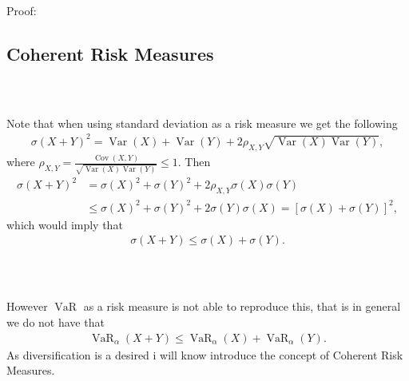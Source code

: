 \documentclass{beamer}
\numberwithin{equation}{section}
\DeclareMathOperator*{\var}{Var}
\DeclareMathOperator*{\cov}{Cov}
\DeclareMathOperator{\VaR}{VaR}
\begin{document}
\begin{frame}\frametitle{{\normalsize \secname} \\ {\large \subsecname}}
    Proof:
    \vspace{6cm}
\end{frame}

\subsection{Coherent Risk Measures}

\begin{frame}\frametitle{{\normalsize \secname} \\ {\large \subsecname}}
    Note that when using standard deviation as a risk measure we get the following
    \begin{align}
        \sigma(X + Y)^2 = \var(X) + \var(Y) + 2\rho_{X,Y}\sqrt{\var(X)\var(Y)},
    \end{align}
    where $\rho_{X,Y} = \frac{\cov(X,Y)}{\sqrt{\var(X)\var(Y)}} \leq 1$.
    Then
    \begin{align}
        \sigma(X + Y)^2 &= \sigma(X)^2 + \sigma(Y)^2 + 2\rho_{X,Y}\sigma(X)\sigma(Y)\\
        &\leq \sigma(X)^2 + \sigma(Y)^2 + 2\sigma(Y)\sigma(X) = \left[\sigma(X) + \sigma(Y)\right]^2, 
    \end{align}
    which would imply that
    \begin{align}
        \sigma(X + Y) \leq \sigma(X) + \sigma(Y).
    \end{align}
\end{frame}

\begin{frame}\frametitle{{\normalsize \secname} \\ {\large \subsecname}}
    However $\VaR$ as a risk measure is not able to reproduce this, that is in general we do not have that
    \begin{align}
        \VaR_\alpha(X + Y) \leq \VaR_\alpha(X) + \VaR_\alpha(Y).
    \end{align}
    As diversification is a desired i will know introduce the concept of Coherent Risk Measures.
\end{frame}
\end{document}
